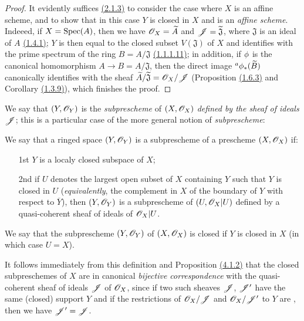 \begin{proof}
\label{proof-prop-1.4.1.2}
It evidently suffices \hyperref[prop-1.2.1.3]{(2.1.3)} to consider the case where $X$ is an
affine scheme, and to show that in this case $Y$ is closed in $X$ and is an {\em affine
scheme}. Indeeed, if $X={\mathop{\mathrm{Spec}}\nolimits}(A)$, then we have $\mathscr{O}_X=\widetilde{A}$ and
$\mathscr{J}=\widetilde{\mathfrak{J}}$, where $\mathfrak{J}$ is an ideal of $A$
\hyperref[thm-1.1.4.1]{(1.4.1)}; $Y$ is then equal to the closed subset $V(\mathfrak{J})$ of
$X$ and identifies with the prime spectrum of the ring $B=A/\mathfrak{J}$
\hyperref[prop-1.1.1.11]{(1.1.1.11)}; in addition, if $\phi$ is the canonical
homomorphism $A\to B=A/\mathfrak{J}$, then the direct image ${}^a\phi_*(\widetilde{B})$
canonically identifies with the sheaf $\widetilde{A}/\widetilde{\mathfrak{J}}=\mathscr{O}_X/\mathscr{J}$
(Proposition \hyperref[prop-1.1.6.3]{(1.6.3)} and Corollary \hyperref[cor-1.1.3.9]{(1.3.9)}),
which finishes the proof.
\end{proof}

We say that $(Y,\mathscr{O}_Y)$ is the {\em subprescheme} of $(X,\mathscr{O}_X)$ {\em defined by the
sheaf of ideals $\mathscr{J}$}; this is a particular case of the more general notion of
{\em subprescheme}:

\begin{defn}[4.1.3]
\label{defn-1.4.1.3}
We say that a ringed space $(Y,\mathscr{O}_Y)$ is a subprescheme of a prescheme $(X,\mathscr{O}_X)$ if:
\begin{itemize}
  \item[1st] $Y$ is a localy closed subspace of $X$;
  \item[2nd] if $U$ denotes the largest open subset of $X$ containing $Y$ such that
    $Y$ is closed in $U$ ({\em equivalently}, the complement in $X$ of the
    boundary of $Y$ with respect to $\overline{Y}$), then $(Y,\mathscr{O}_Y)$ is
    a subprescheme of $(U,\mathscr{O}_X|U)$ defined by a quasi-coherent sheaf of ideals of $\mathscr{O}_X|U$.
\end{itemize}
We say that the subprescheme $(Y,\mathscr{O}_Y)$ of $(X,\mathscr{O}_X)$ is closed if $Y$ is closed in $X$
(in which case $U=X$).
\end{defn}

It follows immediately from this definition and Proposition \hyperref[prop-1.4.1.2]{(4.1.2)}
that the closed subpreschemes of $X$ are in canonical {\em bijective correspondence} with the
quasi-coherent sheaf of ideals $\mathscr{J}$ of $\mathscr{O}_X$, since if two such sheaves
$\mathscr{J}$, $\mathscr{J}'$ have the same (closed) support $Y$ and if the restrictions of
$\mathscr{O}_X/\mathscr{J}$ and $\mathscr{O}_X/\mathscr{J}'$ to $Y$ are , then we have $\mathscr{J}'=\mathscr{J}$.

